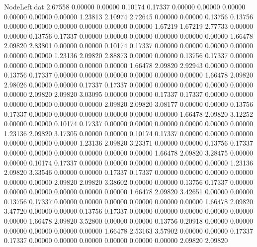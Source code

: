 \begin{filecontents}{NodeLeft.dat}
   2.67558    0.00000    0.00000     0.10174    0.17337    0.00000    0.00000    0.00000    0.00000    0.00000    0.00000    1.23813    2.10974
   2.72645    0.00000    0.00000     0.13756    0.13756    0.00000    0.00000    0.00000    0.00000    0.00000    0.00000    1.67219    1.67219
   2.77733    0.00000    0.00000     0.13756    0.17337    0.00000    0.00000    0.00000    0.00000    0.00000    0.00000    1.66478    2.09820
   2.83801    0.00000    0.00000     0.10174    0.17337    0.00000    0.00000    0.00000    0.00000    0.00000    0.00000    1.23136    2.09820
   2.88873    0.00000    0.00000     0.13756    0.17337    0.00000    0.00000    0.00000    0.00000    0.00000    0.00000    1.66478    2.09820
   2.92943    0.00000    0.00000     0.13756    0.17337    0.00000    0.00000    0.00000    0.00000    0.00000    0.00000    1.66478    2.09820
   2.98026    0.00000    0.00000     0.17337    0.17337    0.00000    0.00000    0.00000    0.00000    0.00000    0.00000    2.09820    2.09820
   3.03095    0.00000    0.00000     0.17337    0.17337    0.00000    0.00000    0.00000    0.00000    0.00000    0.00000    2.09820    2.09820
   3.08177    0.00000    0.00000     0.13756    0.17337    0.00000    0.00000    0.00000    0.00000    0.00000    0.00000    1.66478    2.09820
   3.12252    0.00000    0.00000     0.10174    0.17337    0.00000    0.00000    0.00000    0.00000    0.00000    0.00000    1.23136    2.09820
   3.17305    0.00000    0.00000     0.10174    0.17337    0.00000    0.00000    0.00000    0.00000    0.00000    0.00000    1.23136    2.09820
   3.23371    0.00000    0.00000     0.13756    0.17337    0.00000    0.00000    0.00000    0.00000    0.00000    0.00000    1.66478    2.09820
   3.28475    0.00000    0.00000     0.10174    0.17337    0.00000    0.00000    0.00000    0.00000    0.00000    0.00000    1.23136    2.09820
   3.33546    0.00000    0.00000     0.17337    0.17337    0.00000    0.00000    0.00000    0.00000    0.00000    0.00000    2.09820    2.09820
   3.38602    0.00000    0.00000     0.13756    0.17337    0.00000    0.00000    0.00000    0.00000    0.00000    0.00000    1.66478    2.09820
   3.42651    0.00000    0.00000     0.13756    0.17337    0.00000    0.00000    0.00000    0.00000    0.00000    0.00000    1.66478    2.09820
   3.47720    0.00000    0.00000     0.13756    0.17337    0.00000    0.00000    0.00000    0.00000    0.00000    0.00000    1.66478    2.09820
   3.52800    0.00000    0.00000     0.13756    0.20918    0.00000    0.00000    0.00000    0.00000    0.00000    0.00000    1.66478    2.53163
   3.57902    0.00000    0.00000     0.17337    0.17337    0.00000    0.00000    0.00000    0.00000    0.00000    0.00000    2.09820    2.09820

\end{filecontents}
